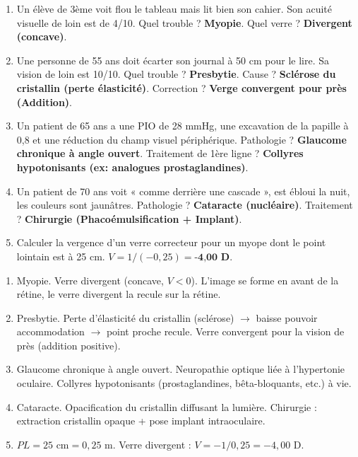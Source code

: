 \documentclass[11pt]{article}
\begin{document}
\begin{exercice}
\begin{enumerate}
    \item Un élève de 3ème voit flou le tableau mais lit bien son cahier. Son acuité visuelle de loin est de 4/10. Quel trouble ? \textbf{Myopie}. Quel verre ? \textbf{Divergent (concave)}.
    \item Une personne de 55 ans doit écarter son journal à 50 cm pour le lire. Sa vision de loin est 10/10. Quel trouble ? \textbf{Presbytie}. Cause ? \textbf{Sclérose du cristallin (perte élasticité)}. Correction ? \textbf{Verge convergent pour près (Addition)}.
    \item Un patient de 65 ans a une PIO de 28 mmHg, une excavation de la papille à 0,8 et une réduction du champ visuel périphérique. Pathologie ? \textbf{Glaucome chronique à angle ouvert}. Traitement de 1ère ligne ? \textbf{Collyres hypotonisants (ex: analogues prostaglandines)}.
    \item Un patient de 70 ans voit « comme derrière une cascade », est ébloui la nuit, les couleurs sont jaunâtres. Pathologie ? \textbf{Cataracte (nucléaire)}. Traitement ? \textbf{Chirurgie (Phacoémulsification + Implant)}.
    \item Calculer la vergence d'un verre correcteur pour un myope dont le point lointain est à 25 cm. $V = 1/(-0,25) = \textbf{-4,00 D}$.
\end{enumerate}
\end{exercice}

\begin{corrige}
\begin{enumerate}
    \item Myopie. Verre divergent (concave, $V<0$). L'image se forme en avant de la rétine, le verre divergent la recule sur la rétine.
    \item Presbytie. Perte d'élasticité du cristallin (sclérose) $\rightarrow$ baisse pouvoir accommodation $\rightarrow$ point proche recule. Verre convergent pour la vision de près (addition positive).
    \item Glaucome chronique à angle ouvert. Neuropathie optique liée à l'hypertonie oculaire. Collyres hypotonisants (prostaglandines, bêta-bloquants, etc.) à vie.
    \item Cataracte. Opacification du cristallin diffusant la lumière. Chirurgie : extraction cristallin opaque + pose implant intraoculaire.
    \item $PL = 25 \text{ cm} = 0,25 \text{ m}$. Verre divergent : $V = -1/0,25 = -4,00 \text{ D}$.
\end{enumerate}
\end{corrige}
\end{document}
